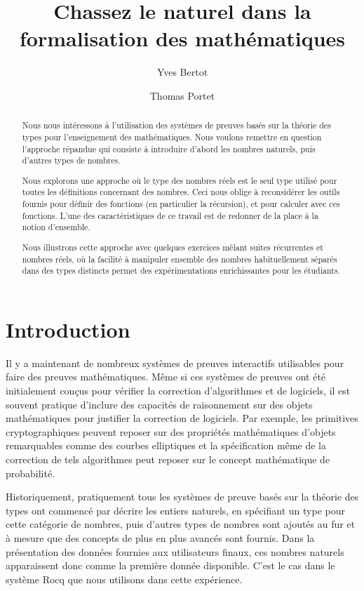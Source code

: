\documentclass{jflart}
\title{Chassez le naturel dans la formalisation des mathématiques}
\author[1]{Yves Bertot}
\author[1]{Thomas Portet}
\affil[1]{Centre Inria de l'Université Côte d'Azur, France}
\begin{document}
\maketitle

\begin{abstract}
  Nous nous intéressons à l'utilisation des systèmes de preuves basés sur la
  théorie des types pour l'enseignement des mathématiques.  Nous voulons
  remettre en question l'approche répandue qui consiste à introduire
  d'abord les nombres naturels, puis d'autres types de nombres.

  Nous explorons une approche où le type des nombres réels est le seul type
  utilisé pour toutes les définitions concernant des nombres.  Ceci nous oblige
  à reconsidérer les outils fournis pour définir des fonctions (en particulier
  la récursion), et pour calculer avec ces fonctions.
  L'une des caractéristiques de ce travail est de redonner de la place à
  la notion d'ensemble.

  Nous illustrons cette approche avec quelques exercices mêlant suites
  récurrentes et nombres réels, où la facilité à manipuler ensemble des nombres
  habituellement séparés dans des types distincts permet des expérimentations
  enrichissantes pour les étudiants.
\end{abstract}

\section{Introduction}

Il y a maintenant de nombreux systèmes de preuves interactifs
utilisables pour faire des preuves mathématiques.  Même si ces
systèmes de preuves ont été initialement conçus pour vérifier la
correction d'algorithmes et de logiciels, il est souvent pratique
d'inclure des capacités de raisonnement sur des objets mathématiques
pour justifier la correction de logiciels.  Par exemple, les
primitives cryptographiques peuvent reposer sur des propriétés
mathématiques d'objets remarquables comme des courbes elliptiques et
la spécification même de la correction de tels algorithmes peut
reposer sur le concept mathématique de probabilité.

Historiquement, pratiquement tous les systèmes de preuve basés sur la
théorie des types ont commencé
par décrire les entiers naturels, en spécifiant un type pour cette
catégorie de nombres, puis d'autres types de nombres sont ajoutés au
fur et à mesure que des concepts de plus en plus avancés sont fournis.
Dans la présentation des données fournies aux utilisateurs finaux, ces
nombres naturels apparaissent donc comme la première donnée
disponible.  C'est le cas dans le système Rocq
\cite{the_coq_development_team_2024_11551307} que nous utilisons dans
cette expérience.
\end{document}
